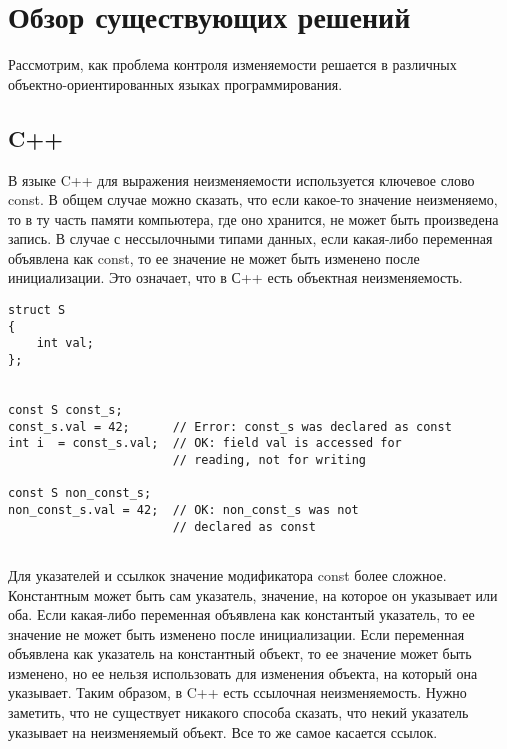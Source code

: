 \section{Обзор существующих решений}

Рассмотрим, как проблема контроля изменяемости решается в различных объектно-ориентированных языках программирования. 

\subsection{C++}

В языке C++ для выражения неизменяемости используется ключевое слово const. В общем случае можно сказать, что если какое-то значение неизменяемо, то в ту часть памяти компьютера, где оно хранится, не может быть произведена запись. В случае с нессылочными типами данных, если какая-либо переменная объявлена как const, то ее значение не может быть изменено после инициализации. Это означает, что в С++ есть объектная неизменяемость.

\begin{lstlisting}[caption=Константая переменная, label=code:const_var]
struct S
{ 
    int val;
};
 

const S const_s;
const_s.val = 42;      // Error: const_s was declared as const
int i  = const_s.val;  // OK: field val is accessed for  
                       // reading, not for writing

const S non_const_s;
non_const_s.val = 42;  // OK: non_const_s was not 
                       // declared as const
	

\end{lstlisting}

Для указателей и ссылкок значение модификатора const более сложное. Константным может быть сам указатель, значение, на которое он указывает или оба. Если какая-либо переменная объявлена как константый указатель, то ее значение не может быть изменено после инициализации. Если переменная объявлена как указатель на константный объект, то ее значение может быть изменено, но ее нельзя использовать для изменения объекта, на который она указывает. Таким образом, в C++ есть ссылочная неизменяемость. Нужно заметить, что не существует никакого способа сказать, что некий указатель указывает на неизменяемый объект. Все то же самое касается ссылок. 

